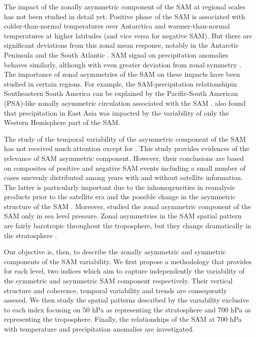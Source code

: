 \documentclass[smallextended]{svjour3}       %
\begin{document}
The impact of the zonally asymmetric component of the SAM at regional scales has not been studied in detail yet. Positive phase of the SAM is associated with colder-than-normal temperatures over Antarctica and warmer-than-normal temperatures at higher latitudes \citep{jones2019} (and vice versa for negative SAM). But there are significant deviations from this zonal mean response, notably in the Antarctic Peninsula and the South Atlantic \citep{fogt2012}. SAM signal on precipitation anomalies behaves similarly, although with even greater deviation from zonal symmetry \citep{lim2016}. The importance of zonal asymmetries of the SAM on these impacts have been studied in certain regions. For example, the SAM-precipitation relationshipin Southeastern South America can be explained by the Pacific-South American (PSA)-like zonally asymmetric circulation associated with the SAM \citep{silvestri2009, rosso2018}. \citet{fan2007} also found that precipitation in East Asia was impacted by the variability of only the Western Hemisphere part of the SAM.

The study of the temporal variability of the asymmetric component of the SAM has not received much attention except for \citet{fogt2012}. This study provides evidences of the relevance of SAM asymmetric component. However, their conclusions are based on composites of positive and negative SAM events including a small number of cases unevenly distributed among years with and without satellite information. The latter is particularly important due to the inhomogeneities in reanalysis products prior to the satellite era and the possible change in the asymmetric structure of the SAM \citep{silvestri2009}. Moreover, \citet{fogt2012} studied the zonal asymmetric component of the SAM only in sea level pressure. Zonal asymmetries in the SAM spatial pattern are fairly barotropic throughout the troposphere, but they change dramatically in the stratosphere \citep{baldwin2009}.

Our objective is, then, to describe the zonally asymmetric and symmetric components of the SAM variability. We first propose a methodology that provides for each level, two indices which aim to capture independently the variability of the symmetric and asymmetric SAM component respectively. Their vertical structure and coherence, temporal variability and trends are consequently assesed. We then study the spatial patterns described by the variability exclusive to each index focusing on 50 hPa as representing the stratosphere and 700 hPa as representing the troposphere. Finally, the relationships of the SAM at 700 hPa with temperature and precipitation anomalies are investigated.
\end{document}
